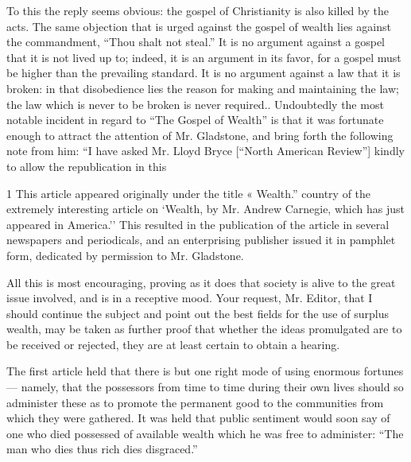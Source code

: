 \documentclass[11pt,openany]{book}
\begin{document}
To this the reply seems obvious: the gospel of Christianity is also killed by the acts. The same objection that is urged against the gospel of wealth lies against the commandment, ``Thou shalt not steal.'' It is no argument against a gospel that it is not lived up to; indeed, it is an argument in its favor, for a gospel must be higher than the prevailing standard. It is no argument against a law that it is broken: in that disobedience lies the reason for making and maintaining the law; the law which is never to be broken is never required.. Undoubtedly the most notable incident in regard to ``The Gospel of Wealth'' is that it was fortunate enough to attract the attention of Mr. Gladstone, and bring forth the following note from him: ``I have asked Mr. Lloyd Bryce [``North American Review''] kindly to allow the republication in this

1 This article appeared originally under the title « Wealth.'' country of the extremely interesting article on `Wealth, by Mr. Andrew Carnegie, which has just appeared in America.'' This resulted in the publication of the article in several newspapers and periodicals, and an enterprising publisher issued it in pamphlet form, dedicated by permission to Mr. Gladstone.

All this is most encouraging, proving as it does that society is alive to the great issue involved, and is in a receptive mood. Your request, Mr. Editor, that I should continue the subject and point out the best fields for the use of surplus wealth, may be taken as further proof that whether the ideas promulgated are to be received or rejected, they are at least certain to obtain a hearing.

The first article held that there is but one right mode of using enormous fortunes--- namely, that the possessors from time to time during their own lives should so administer these as to promote the permanent good to the communities from which they were gathered. It was held that public sentiment would soon say of one who died possessed of available wealth which he was free to administer: ``The man who dies thus rich dies disgraced.''
\end{document}

